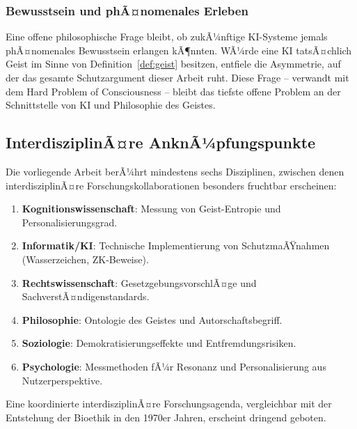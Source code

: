 ﻿\documentclass[a4paper,12pt]{article}
\theoremstyle{definition}
\begin{document}
\subsubsection{Bewusstsein und phÃ¤nomenales Erleben}

Eine offene philosophische Frage bleibt, ob zukÃ¼nftige KI-Systeme jemals phÃ¤nomenales
Bewusstsein erlangen kÃ¶nnten. WÃ¼rde eine KI tatsÃ¤chlich Geist im Sinne von
Definition~\ref{def:geist} besitzen, entfiele die Asymmetrie, auf der das gesamte
Schutzargument dieser Arbeit ruht. Diese Frage -- verwandt mit dem Hard Problem of
Consciousness \cite{chalmers1996conscious} -- bleibt das tiefste offene Problem an
der Schnittstelle von KI und Philosophie des Geistes.

\subsection{InterdisziplinÃ¤re AnknÃ¼pfungspunkte}

Die vorliegende Arbeit berÃ¼hrt mindestens sechs Disziplinen, zwischen denen
interdisziplinÃ¤re Forschungskollaborationen besonders fruchtbar erscheinen:

\begin{enumerate}
    \item \textbf{Kognitionswissenschaft}: Messung von Geist-Entropie und
          Personalisierungsgrad.
    \item \textbf{Informatik/KI}: Technische Implementierung von SchutzmaÃŸnahmen
          (Wasserzeichen, ZK-Beweise).
    \item \textbf{Rechtswissenschaft}: GesetzgebungsvorschlÃ¤ge und
          SachverstÃ¤ndigenstandards.
    \item \textbf{Philosophie}: Ontologie des Geistes und Autorschaftsbegriff.
    \item \textbf{Soziologie}: Demokratisierungseffekte und Entfremdungsrisiken.
    \item \textbf{Psychologie}: Messmethoden fÃ¼r Resonanz und Personalisierung aus
          Nutzerperspektive.
\end{enumerate}

Eine koordinierte interdisziplinÃ¤re Forschungsagenda, vergleichbar mit der
Entstehung der Bioethik in den 1970er Jahren, erscheint dringend geboten.
\end{document}
